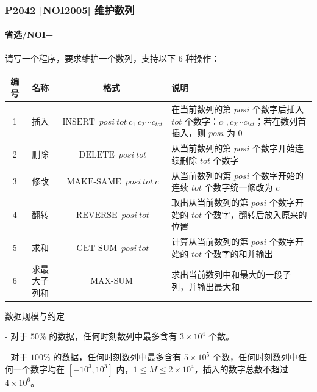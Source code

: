 \documentclass[utf8]{ctexbeamer}
\begin{document}
    \begin{frame}
        \frametitle{\href{https://www.luogu.com.cn/problem/P2042}{P2042 [NOI2005] 维护数列}}
        \framesubtitle{\textcolor[RGB]{157,61,207}{省选/NOI−}}
        请写一个程序，要求维护一个数列，支持以下 $6$ 种操作：

        \begin{table}[h]
            \tiny
            \centering
            \begin{tabularx}{\textwidth}{|c|c|c|X|}
                \hline
                编号 & 名称 & 格式 & 说明 \\ \hline
                1 & 插入 & $\operatorname{INSERT}\ posi \ tot \ c_1 \ c_2 \cdots c_{tot}$ & 在当前数列的第 $posi$ 个数字后插入 $tot$ 个数字：$c_1, c_2 \cdots c_{tot}$；若在数列首插入，则 $posi$ 为 $0$ \\ \hline
                2 & 删除 & $\operatorname{DELETE} \ posi \ tot$ & 从当前数列的第 $posi$ 个数字开始连续删除 $tot$ 个数字 \\ \hline
                3 & 修改 & $\operatorname{MAKE-SAME} \ posi \ tot \ c$ & 从当前数列的第 $posi$ 个数字开始的连续 $tot$ 个数字统一修改为 $c$ \\ \hline
                4 & 翻转 & $\operatorname{REVERSE}\ posi \ tot$ & 取出从当前数列的第 $posi$ 个数字开始的 $tot$ 个数字，翻转后放入原来的位置 \\ \hline
                5 & 求和 & $\operatorname{GET-SUM} \ posi \ tot$ & 计算从当前数列的第 $posi$ 个数字开始的 $tot$ 个数字的和并输出 \\ \hline
                6 & 求最大子列和 & $\operatorname{MAX-SUM}$ & 求出当前数列中和最大的一段子列，并输出最大和 \\ \hline
            \end{tabularx}
        \end{table}
        数据规模与约定

        - 对于 $50\%$ 的数据，任何时刻数列中最多含有 $3 \times 10^4$ 个数。

        - 对于 $100\%$ 的数据，任何时刻数列中最多含有 $5 \times 10^5$ 个数，任何时刻数列中任何一个数字均在 $[-10^3, 10^3]$ 内，$1 \le M \le 2 \times 10^4$，插入的数字总数不超过 $4 \times 10^6$。
    \end{frame}
\end{document}

